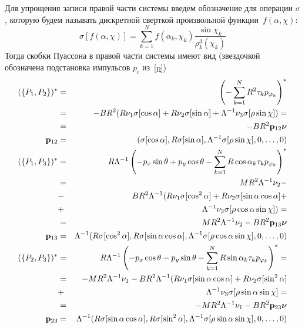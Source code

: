 Для упрощения записи правой части системы введем обозначение для операции $\sigma$, которую будем называть дискретной сверткой произвольной функции~$f(\alpha, \chi)$:
$$
\sigma[f(\alpha,\chi)] = \sum\limits_{k=1}^{N} f(\alpha_k,\chi_k) \frac{\sin\chi_k}{\rho_k^3(\chi_k)}
$$
Тогда скобки Пуассона в правой части системы имеют вид (звездочкой обозначена подстановка импульсов $p_i$ из~\ref{p})
\hspace{-35pt}
\begin{eqnarray*}
    (\{P_1,P_2\})^* &=& \left(-\sum\limits_{k=1}^{N} R^2\tau_kp_{\varphi_k}\right)^* \\
                    &=& -BR^2(R\nu_1 \sigma[\cos\alpha] + R\nu_2 \sigma[\sin\alpha] + \Lambda^{-1}\nu_3\sigma[\rho\sin\chi]) = \\
                    &=& -BR^2\mathbf{p}_{12}\boldsymbol{\mathbf{\nu}}\\
    \mathbf{p}_{12}      &=& (\sigma[\cos\alpha], R\sigma[\sin\alpha], \Lambda^{-1}\sigma[\rho\sin\chi], 0,\dots,0) \\
    (\{P_1,P_3\})^* &=& {R}{\Lambda}^{-1}\left(-p_x\sin\theta + p_y\cos\theta - \sum\limits_{k=1}^{N} R\cos\alpha_k\tau_kp_{\varphi_k}\right)^* \\
                    &=& {MR^2}{\Lambda}^{-1}\nu_2 - \\
                    &-& {BR^2}{\Lambda}^{-1}(R\nu_1 \sigma[\cos^2\alpha] + R\nu_2 \sigma[\sin\alpha\cos\alpha] +\\
                    &+& \Lambda^{-1}\nu_3\sigma[\rho\cos\alpha\sin\chi]) = \\
                    &=& {MR^2}{\Lambda}^{-1}\nu_2-{BR^2} \mathbf{p}_{13}\boldsymbol{\mathbf{\nu}} \\
    \mathbf{p}_{13}      &=& \Lambda^{-1} (R\sigma[\cos^2\alpha], R\sigma[\sin\alpha\cos\alpha], \Lambda^{-1}\sigma[\rho\cos\alpha\sin\chi], 0,\dots,0) \\
    (\{P_2,P_3\})^* &=& {R}{\Lambda}^{-1}\left(-p_x\cos\theta - p_y\sin\theta - \sum\limits_{k=1}^{N} R\sin\alpha_k\tau_kp_{\varphi_k}\right)^* = \\
                    &=& -{MR^2}{\Lambda}^{-1}\nu_1 - {BR^2}{\Lambda}^{-1}(R\nu_1\sigma[\sin\alpha\cos\alpha] + R\nu_2\sigma[\sin^2\alpha] \\
                    &+& \Lambda^{-1}\nu_3\sigma[\rho\sin\alpha\sin\chi] = \\
                    &=& -{MR^2}{\Lambda}^{-1}\nu_1 -{BR^2}\mathbf{p}_{23}\boldsymbol{\mathbf{\nu}}\\
    \mathbf{p}_{23}      &=& \Lambda^{-1}(R\sigma[\sin\alpha\cos\alpha], R\sigma[\sin^2\alpha], \Lambda^{-1}\sigma[\rho\sin\alpha\sin\chi], 0,\dots,0)
\end{eqnarray*}

